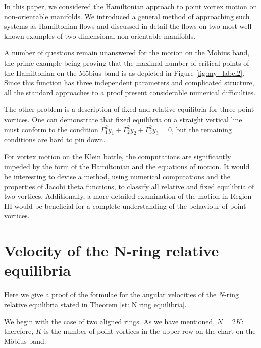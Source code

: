 \documentclass[11pt,twoside]{article}
\theoremstyle{definition}
\numberwithin{equation}{section}
\begin{document}
In this paper, we considered the Hamiltonian approach to point vortex motion on non-orientable manifolds.  We introduced a general method of approaching such systems as Hamiltonian flows and discussed in detail the flows on two most well-known examples of two-dimensional non-orientable manifolds. 

A number of questions remain unanswered for the motion on the Mobius band, the prime example being proving that the maximal number of critical points of the Hamiltonian on the M\"obius band is as depicted in Figure \ref{fig:my_label2}. Since this function has three independent parameters and complicated structure, all the standard approaches to a proof present considerable numerical difficulties.

The other problem is a description of fixed and relative equilibria for three point vortices. One can demonstrate  that fixed equilibria on a straight vertical line must conform to the condition $\Gamma_1^2y_1 + \Gamma_2^2y_2 + \Gamma_3^2y_3=0$, but the remaining conditions are hard to pin down. 

For vortex motion on the Klein bottle, the computations are significantly impeded by the form of the Hamiltonian and the equations of motion. It would be interesting to devise a method, using numerical computations and the properties of Jacobi theta functions, to classify all relative and fixed equilibria of two vortices. Additionally, a more detailed examination of the motion in Region III would be beneficial for a complete  understanding of the behaviour of point vortices. 


\appendix
\section{Velocity of the N-ring relative equilibria}
\label{sec: Appendix}




Here we give a proof of the formulae for the angular velocities of the $N$-ring relative equilibria stated in Theorem \ref{st: N ring equilibria}. 

We begin with the case of two aligned rings.  As we have mentioned, $N =2K$: therefore, $K$ is the number of point vortices in the upper row on the chart on the M\"obius band.
\end{document}
